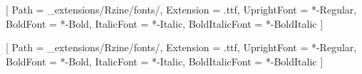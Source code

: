 \usepackage{tikz}
\usepackage{xcolor}
\usepackage{tabularx}
\usepackage{orcidlink}
\usepackage{lineno}
\usepackage{draftwatermark}
\usepackage{fontspec}
\usepackage{fvextra} %

\setmainfont{LiberationSans}[
  Path = _extensions/Rzine/fonts/,
  Extension = .ttf,
  UprightFont = *-Regular,
  BoldFont = *-Bold,
  ItalicFont = *-Italic,
  BoldItalicFont = *-BoldItalic
]

\setsansfont{LiberationSans}[
  Path = _extensions/Rzine/fonts/,
  Extension = .ttf,
  UprightFont = *-Regular,
  BoldFont = *-Bold,
  ItalicFont = *-Italic,
  BoldItalicFont = *-BoldItalic
]

